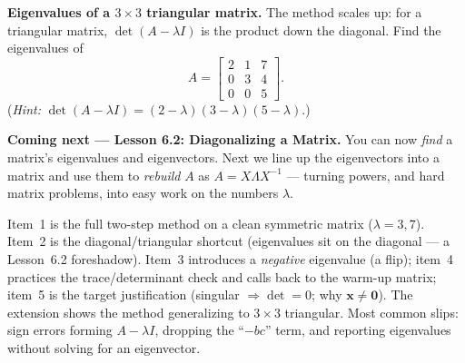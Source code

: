 \documentclass[10pt]{article}
\newcommand{\xx}{\mathbf{x}}
\newcommand{\zero}{\mathbf{0}}
\begin{document}
\begin{extensionbox}
\textbf{Eigenvalues of a $3\times3$ triangular matrix.} The method scales up: for a triangular matrix,
$\det(A-\lambda I)$ is the product down the diagonal. Find the eigenvalues of
\[
  A=\begin{bmatrix} 2 & 1 & 7 \\ 0 & 3 & 4 \\ 0 & 0 & 5 \end{bmatrix}.
\]
(\emph{Hint:} $\det(A-\lambda I)=(2-\lambda)(3-\lambda)(5-\lambda)$.)
\end{extensionbox}

\begin{spiralbox}
\textbf{Coming next --- Lesson 6.2: Diagonalizing a Matrix.} You can now \emph{find} a matrix's
eigenvalues and eigenvectors. Next we line up the eigenvectors into a matrix and use them to
\emph{rebuild} $A$ as $A=X\Lambda X^{-1}$ --- turning powers, and hard matrix problems, into easy work
on the numbers $\lambda$.
\end{spiralbox}

\begin{teachernote}
Item~1 is the full two-step method on a clean symmetric matrix ($\lambda=3,7$). Item~2 is the
diagonal/triangular shortcut (eigenvalues sit on the diagonal --- a Lesson~6.2 foreshadow). Item~3
introduces a \emph{negative} eigenvalue (a flip); item~4 practices the trace/determinant check and
calls back to the warm-up matrix; item~5 is the target justification (singular $\Rightarrow\det=0$;
why $\xx\ne\zero$). The extension shows the method generalizing to $3\times3$ triangular. Most common
slips: sign errors forming $A-\lambda I$, dropping the ``$-bc$'' term, and reporting eigenvalues
without solving for an eigenvector.
\end{teachernote}
\end{document}
